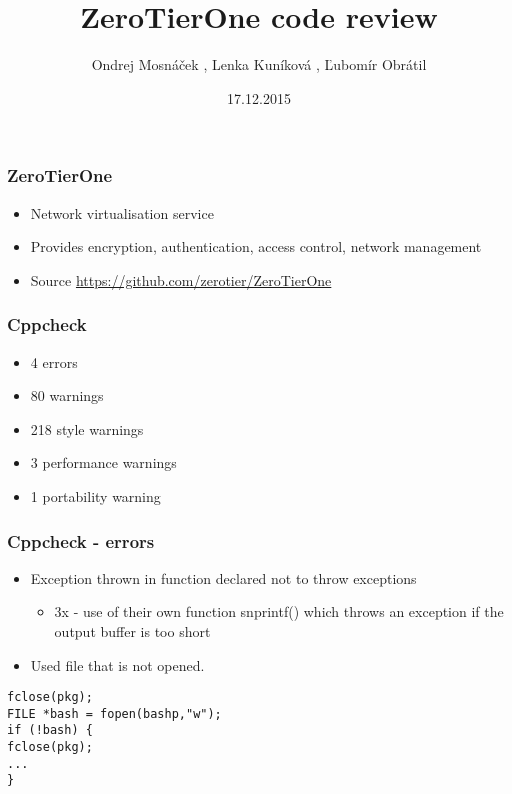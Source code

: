 \documentclass{beamer}
\title[ZeroTierOne code review]{ZeroTierOne code review} %
\author[R Team]{Ondrej Mosnáček , Lenka Kuníková , Ľubomír Obrátil} %
\date{17.12.2015} %
\begin{document}
\begin{frame}
\titlepage %
\end{frame}


\begin{frame}
\frametitle{ZeroTierOne}
\begin{itemize}
\item Network virtualisation service
\item Provides encryption, authentication, access control, network management
\item Source \url{https://github.com/zerotier/ZeroTierOne}
\end{itemize}
\end{frame}

\begin{frame}
\frametitle{Cppcheck}
\begin{itemize}
\item 4 errors
\item 80 warnings
\item 218 style warnings
\item 3 performance warnings
\item 1 portability warning
\end{itemize}
\end{frame}

\begin{frame}[fragile]
\frametitle{Cppcheck - errors}
\begin{itemize}
\item Exception thrown in function declared not to throw exceptions
\begin{itemize}
\item 3x - use of their own function snprintf() which throws an exception if the output buffer is too short
\end{itemize}
\item Used file that is not opened.
\end{itemize}
\begin{lstlisting}
fclose(pkg);
FILE *bash = fopen(bashp,"w");
if (!bash) {
fclose(pkg);
...
}
\end{lstlisting}
\end{frame}
\end{document}
